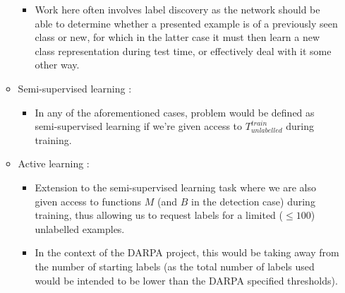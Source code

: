 \documentclass{article}
\begin{document}
\begin{itemize}
\begin{itemize}
\begin{itemize}
                \item Work here often involves label discovery as the network should be able to determine whether a presented example is of a previously seen class or new, for which in the latter case it must then learn a new class representation during test time, or effectively deal with it some other way.
            \end{itemize}
            \item Semi-supervised learning \cite{DBLP:journals/corr/boney2017}:
            \begin{itemize}
                \item In any of the aforementioned cases, problem would be defined as semi-supervised learning if we're given access to $T_{unlabelled}^{train}$ during training.
            \end{itemize}
            \item Active learning \cite{DBLP:journals/corr/boney2017}:
            \begin{itemize}
                \item Extension to the semi-supervised learning task where we are also given access to functions $M$ (and $B$ in the detection case) during training, thus allowing us to request labels for a limited ($\le100$) unlabelled examples.
                \item In the context of the DARPA project, this would be taking away from the number of starting labels (as the total number of labels used would be intended to be lower than the DARPA specified thresholds).
            \end{itemize}
        \end{itemize}
    \end{itemize}
    


\end{document}
